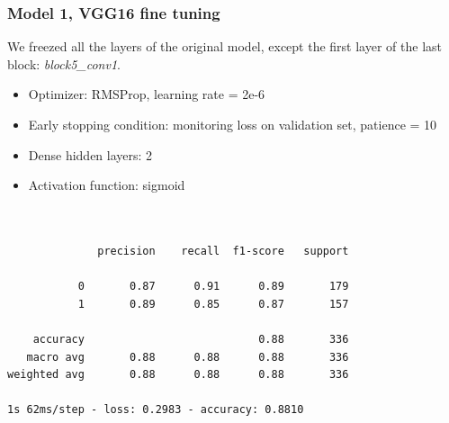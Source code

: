 \documentclass{article}
\begin{document}
\subsubsection{Model 1, VGG16 fine tuning}
We freezed all the layers of the original model, except the first layer of the last block: \textit{block5\_conv1}.

\begin{itemize}
\item Optimizer: RMSProp, learning rate = 2e-6
\item Early stopping condition: monitoring loss on validation set, patience = 10
\item Dense hidden layers: 2
\item Activation function: sigmoid
\end{itemize}

\begin{verbatim}


              precision    recall  f1-score   support

           0       0.87      0.91      0.89       179
           1       0.89      0.85      0.87       157

    accuracy                           0.88       336
   macro avg       0.88      0.88      0.88       336
weighted avg       0.88      0.88      0.88       336

1s 62ms/step - loss: 0.2983 - accuracy: 0.8810

\end{verbatim}
\end{document}
